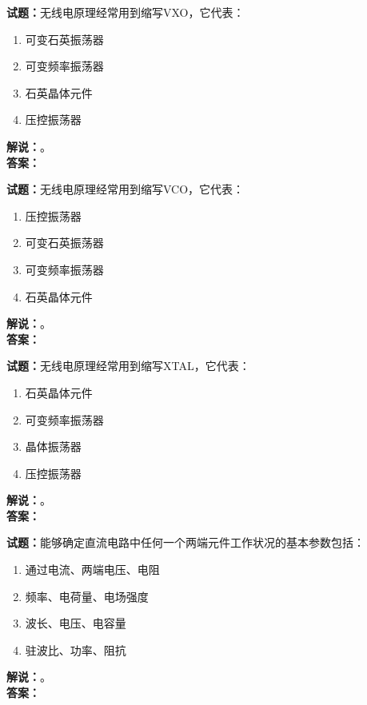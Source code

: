 \documentclass{ctexbook}
\begin{document}
\bigskip




\noindent\textbf{试题：}无线电原理经常用到缩写VXO，它代表：
\begin{enumerate}[leftmargin=3em]
\item 可变石英振荡器
\item 可变频率振荡器
\item 石英晶体元件
\item 压控振荡器
\end{enumerate}
\noindent\textbf{解说：}\textbf{}。\\\noindent\textbf{答案：}

\bigskip




\noindent\textbf{试题：}无线电原理经常用到缩写VCO，它代表：
\begin{enumerate}[leftmargin=3em]
\item 压控振荡器
\item 可变石英振荡器
\item 可变频率振荡器
\item 石英晶体元件
\end{enumerate}
\noindent\textbf{解说：}\textbf{}。\\\noindent\textbf{答案：}

\bigskip




\noindent\textbf{试题：}无线电原理经常用到缩写XTAL，它代表：
\begin{enumerate}[leftmargin=3em]
\item 石英晶体元件
\item 可变频率振荡器
\item 晶体振荡器
\item 压控振荡器
\end{enumerate}
\noindent\textbf{解说：}\textbf{}。\\\noindent\textbf{答案：}

\bigskip




\noindent\textbf{试题：}能够确定直流电路中任何一个两端元件工作状况的基本参数包括：
\begin{enumerate}[leftmargin=3em]
\item 通过电流、两端电压、电阻
\item 频率、电荷量、电场强度
\item 波长、电压、电容量
\item 驻波比、功率、阻抗
\end{enumerate}
\noindent\textbf{解说：}\textbf{}。\\\noindent\textbf{答案：}
\end{document}
